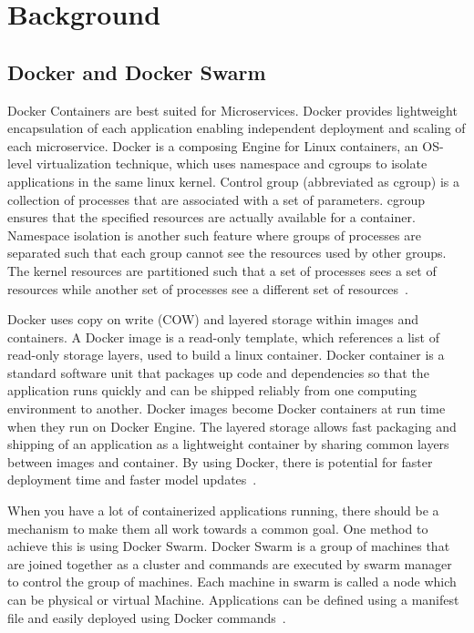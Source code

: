 \section{Background}

\subsection{Docker and Docker Swarm}
Docker Containers are best suited for Microservices. Docker provides lightweight encapsulation of each application enabling independent deployment and scaling of each microservice. Docker is a composing Engine for Linux containers, an OS-level virtualization technique, which uses namespace and cgroups to isolate applications in the same linux kernel. Control group (abbreviated as cgroup) is a collection of processes that are associated with a set of parameters. cgroup ensures that the specified resources are actually available for a container. Namespace isolation is another such feature where groups of processes are separated such that each group cannot see the resources used by other groups. The kernel resources are partitioned such that a set of processes sees a set of resources while another set of processes see a different set of resources~\cite{docker_article}. 

Docker uses copy on write (COW) and layered storage within images and containers. A Docker image is a read-only template, which references a list of read-only storage layers, used to build a linux container. Docker container is a standard software unit that packages up code and dependencies so that the application runs quickly and can be shipped reliably from one computing environment to another. Docker images become Docker containers at run time when they run on Docker Engine. The layered storage allows fast packaging and shipping of an application as a lightweight container by sharing common layers between images and container. By using Docker, there is potential for faster deployment time and faster model updates~\cite{docker_article}.

When you have a lot of containerized applications running, there should be a mechanism to make them all work towards a common goal. One method to achieve this is using Docker Swarm. Docker Swarm is a group of machines that are joined together as a cluster and commands are executed by swarm manager to control the group of machines. Each machine in swarm is called a node which can be physical or virtual Machine. Applications can be defined using a manifest file and easily deployed using Docker commands~\cite{swarm_docker}.


